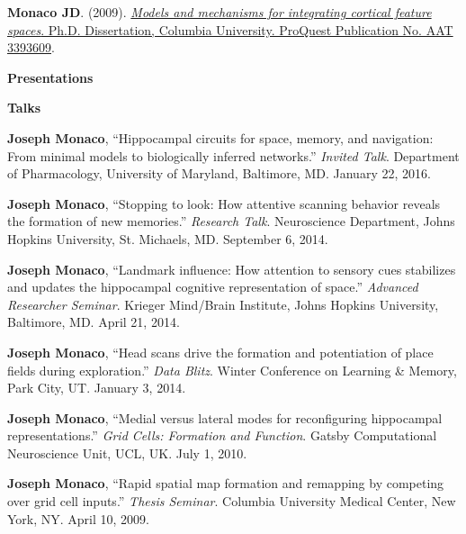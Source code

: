 \documentclass[10pt]{article}
\begin{document}
\begin{description}
\item \textbf{Monaco JD}. (2009). \href{http://search.proquest.com/docview/304862872/abstract}{\emph{Models and mechanisms for integrating cortical feature spaces}. Ph.D. Dissertation, Columbia University. ProQuest Publication No. AAT 3393609}.
\end{description}

{\large \textbf{Presentations}}

\begin{description}
\item \textbf{Talks}
\item[\quad] \textbf{Joseph Monaco}, ``Hippocampal circuits for space, memory, and navigation: From minimal models to biologically inferred networks.'' \emph{Invited Talk}. Department of Pharmacology, University of Maryland, Baltimore, MD. January 22, 2016.
\item[\quad] \textbf{Joseph Monaco}, ``Stopping to look: How attentive scanning behavior reveals the formation of new memories.'' \emph{Research Talk}. Neuroscience Department, Johns Hopkins University, St. Michaels, MD. September 6, 2014.
\item[\quad] \textbf{Joseph Monaco}, ``Landmark influence: How attention to sensory cues stabilizes and updates the hippocampal cognitive representation of space.'' \emph{Advanced Researcher Seminar}. Krieger Mind/Brain Institute, Johns Hopkins University, Baltimore, MD. April 21, 2014.
\item[\quad] \textbf{Joseph Monaco}, ``Head scans drive the formation and potentiation of place fields during exploration.'' \emph{Data Blitz}. Winter Conference on Learning \& Memory, Park City, UT. January 3, 2014.
\item[\quad] \textbf{Joseph Monaco}, ``Medial versus lateral modes for reconfiguring hippocampal representations.'' \emph{Grid Cells: Formation and Function}. Gatsby Computational Neuroscience Unit, UCL, UK. July 1, 2010.
\item[\quad] \textbf{Joseph Monaco}, ``Rapid spatial map formation and remapping by competing over grid cell inputs.'' \emph{Thesis Seminar}. Columbia University Medical Center, New York, NY. April 10, 2009.
\end{description}
\end{document}
